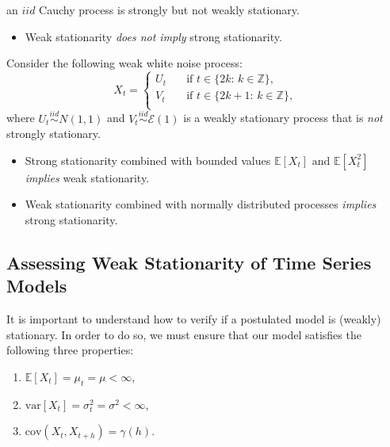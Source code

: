 \documentclass[]{book}
\providecommand{\tightlist}{%
  \setlength{\itemsep}{0pt}\setlength{\parskip}{0pt}}
\theoremstyle{definition}
\theoremstyle{definition}
\theoremstyle{definition}
\theoremstyle{remark}
\let\BeginKnitrBlock\begin \let\EndKnitrBlock\end
\begin{document}
\BeginKnitrBlock{example}
\protect\hypertarget{exm:strongnotweak}{}{\label{exm:strongnotweak} }an
\(iid\) Cauchy process is strongly but not weakly stationary.
\EndKnitrBlock{example}

\begin{itemize}
\tightlist
\item
  Weak stationarity \emph{does not imply} strong stationarity.
\end{itemize}

\BeginKnitrBlock{example}
\protect\hypertarget{exm:weaksplit}{}{\label{exm:weaksplit} }Consider the
following weak white noise process: \begin{equation*}
X_t = \begin{cases}
U_{t}      & \quad \text{if } t \in \{2k:\, k\in \mathbb{Z} \}, \\
V_{t}      & \quad \text{if } t \in \{2k+1:\, k\in \mathbb{Z} \},\\
\end{cases}
\end{equation*} where
\({U_t} \mathop \sim \limits^{iid} N\left( {1,1} \right)\) and
\({V_t}\mathop \sim \limits^{iid} \mathcal{E}\left( 1 \right)\) is a
weakly stationary process that is \emph{not} strongly stationary.
\EndKnitrBlock{example}

\begin{itemize}
\tightlist
\item
  Strong stationarity combined with bounded values \(\mathbb{E}[X_t]\)
  and \(\mathbb{E}[X_t^2]\) \emph{implies} weak stationarity.
\item
  Weak stationarity combined with normally distributed processes
  \emph{implies} strong stationarity.
\end{itemize}

\hypertarget{assessing-weak-stationarity-of-time-series-models}{%
\subsection{Assessing Weak Stationarity of Time Series
Models}\label{assessing-weak-stationarity-of-time-series-models}}

It is important to understand how to verify if a postulated model is
(weakly) stationary. In order to do so, we must ensure that our model
satisfies the following three properties:

\begin{enumerate}
\def\labelenumi{\arabic{enumi}.}
\tightlist
\item
  \(\mathbb{E}\left[X_t \right] = \mu_t = \mu < \infty\),
\item
  \(\text{var}\left[X_t \right] = \sigma^2_t = \sigma^2 < \infty\),
\item
  \(\text{cov}\left(X_t, X_{t+h} \right) = \gamma \left(h\right)\).
\end{enumerate}
\end{document}
